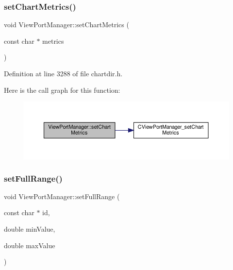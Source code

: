 \subsubsection{\texorpdfstring{set\+Chart\+Metrics()}{setChartMetrics()}}
{\footnotesize\ttfamily void View\+Port\+Manager\+::set\+Chart\+Metrics (\begin{DoxyParamCaption}\item[{const char $\ast$}]{metrics }\end{DoxyParamCaption})\hspace{0.3cm}{\ttfamily [inline]}}



Definition at line 3288 of file chartdir.\+h.

Here is the call graph for this function\+:
\nopagebreak
\begin{figure}[H]
\begin{center}
\leavevmode
\includegraphics[width=350pt]{class_view_port_manager_af4bdc161db91ed516987f6a358f02bab_cgraph}
\end{center}
\end{figure}
\mbox{\label{class_view_port_manager_accd91f779d15c0e92e1021a1954697d8}} 
\subsubsection{\texorpdfstring{set\+Full\+Range()}{setFullRange()}}
{\footnotesize\ttfamily void View\+Port\+Manager\+::set\+Full\+Range (\begin{DoxyParamCaption}\item[{const char $\ast$}]{id,  }\item[{double}]{min\+Value,  }\item[{double}]{max\+Value }\end{DoxyParamCaption})\hspace{0.3cm}{\ttfamily [inline]}}



